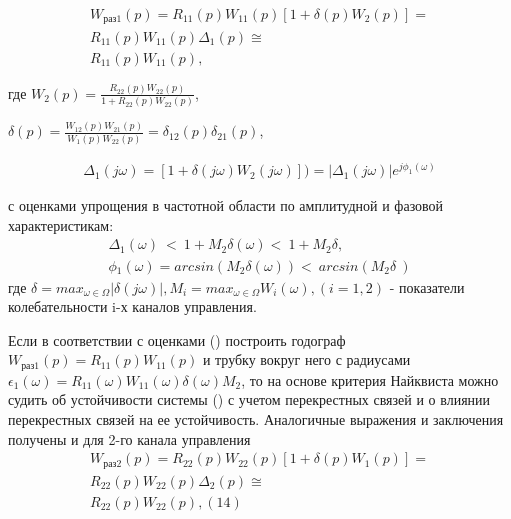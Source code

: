 \begin{equation}
\label{eq:p2:12-}
\begin{alignedat}{4}
W_{\textit{раз1}}\left(p\right)=
R_{11}\left(p\right)W_{11}\left(p\right)\left[1+\delta{}\left(p\right)W_2\left(p\right)\right]=\\
R_{11}\left(p\right)W_{11}\left(p\right){\Delta{}}_1\left(p\right)\cong{}\\
R_{11}\left(p\right)W_{11}\left(p\right) ,
\end{alignedat}
\end{equation}

где $W_{2}(p)=\frac{R_{22}(p)W_{22}(p)}{1+R_{22}(p)W_{22}(p)}$, 

$\delta{}(p)=\frac{W_{12}(p)W_{21}(p)}{W_{1}(p)W_{22}(p)}=\delta{}_{12}(p)\delta{}_{21}(p)$,

\begin{equation}
\label{eq:p2:14-1}
\begin{alignedat}{2}
{\Delta{}}_1(j\omega{})=[1+\delta{}(j\omega{})W_2(j\omega{})])=\left\vert{}{\Delta{}}_1(j\omega{})\right\vert{}e^{j{\phi{}}_1(\omega{})}
\end{alignedat}
\end{equation}

с оценками упрощения в частотной области по амплитудной и фазовой характеристикам: 
\begin{equation}
\label{eq:p2:13-}
\begin{alignedat}{2}
\Delta{}_1(\omega{})\ <\ 1+M_2\delta{}(\omega{})<\ 1+M_2\delta{},\\
\phi{}_1(\omega{})=arcsin(M_2\delta{}(\omega{}))<\ arcsin(M_2\delta{}\ )
\end{alignedat}
\end{equation}
где 
$\delta{}=max_{\omega{}\in{}\Omega{}}\left\vert{}\delta{}(j\omega{})\right\vert{},M_i=max_{\omega{}\in{}\Omega{}}W_i(\omega{}),(i=1,2)$ - показатели колебательности i-х каналов управления.

Если в соответствии с оценками () построить годограф
$W_{\textit{раз1}}\left(p\right)=R_{11}\left(p\right)W_{11}\left(p\right)$
и трубку вокруг него с радиусами 
${\epsilon{}}_1\left(\omega{}\right)=R_{11}\left(\omega{}\right)W_{11}\left(\omega{}\right)\delta{}\left(\omega{}\right)M_2$, 
то на основе критерия Найквиста можно судить об устойчивости системы () с учетом перекрестных связей и о влиянии перекрестных связей на ее устойчивость. Аналогичные выражения и заключения получены и для 2-го канала управления
\begin{equation}
\label{eq:p2:14-}
\begin{alignedat}{2}
W_{\textit{раз2}}\left(p\right)=R_{22}\left(p\right)W_{22}\left(p\right)\left[1+\delta{}\left(p\right)W_1\left(p\right)\right]=\\
R_{22}\left(p\right)W_{22}\left(p\right){\Delta{}}_2\left(p\right)\cong{}\\
R_{22}\left(p\right)W_{22}\left(p\right),\left(14\right)
\end{alignedat}
\end{equation}


